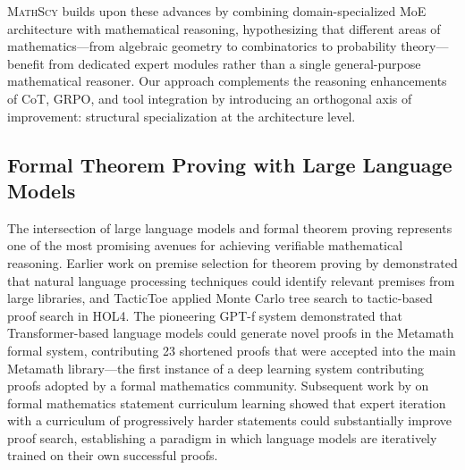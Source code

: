 \documentclass[11pt,a4paper]{article}
\newcommand{\mathscy}{\textsc{MathScy}}
\begin{document}
\mathscy{} builds upon these advances by combining domain-specialized MoE architecture with mathematical reasoning, hypothesizing that different areas of mathematics---from algebraic geometry to combinatorics to probability theory---benefit from dedicated expert modules rather than a single general-purpose mathematical reasoner. Our approach complements the reasoning enhancements of CoT, GRPO, and tool integration by introducing an orthogonal axis of improvement: structural specialization at the architecture level.

\subsection{Formal Theorem Proving with Large Language Models}

The intersection of large language models and formal theorem proving represents one of the most promising avenues for achieving verifiable mathematical reasoning. Earlier work on premise selection for theorem proving by \citet{ferreira2020natural} demonstrated that natural language processing techniques could identify relevant premises from large libraries, and TacticToe \citep{gauthier2021tactictoe} applied Monte Carlo tree search to tactic-based proof search in HOL4. The pioneering GPT-f system \citep{polu2020generative} demonstrated that Transformer-based language models could generate novel proofs in the Metamath formal system, contributing 23 shortened proofs that were accepted into the main Metamath library---the first instance of a deep learning system contributing proofs adopted by a formal mathematics community. Subsequent work by \cite{polu2023formal} on formal mathematics statement curriculum learning showed that expert iteration with a curriculum of progressively harder statements could substantially improve proof search, establishing a paradigm in which language models are iteratively trained on their own successful proofs.
\end{document}
